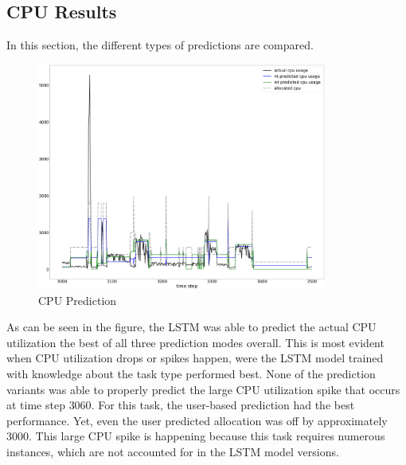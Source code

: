 \documentclass{article}
\begin{document}
  \subsection{CPU Results}
  \label{sec:cpu-results}


    In this section, the different types of predictions are compared.
    
    \begin{figure}[h!]
      \centering
      \includegraphics[width=0.85\textwidth]{figures/training_cpu_prediction.png}
      \caption{CPU Prediction}
      \label{fig:cpu-prediction}
    \end{figure}
    As can be seen in the figure, the LSTM  was able to predict the actual CPU utilization the best of all three prediction modes overall.
    This is most evident when CPU utilization drops or spikes happen, were the LSTM model trained with knowledge about the task type performed best.
    None of the prediction variants was able to properly predict the large CPU utilization spike that occurs at time step $3060$. For this task, the user-based prediction had the best performance. Yet, even the user predicted allocation was off by approximately 3000. This large CPU spike is happening because this task requires numerous instances, which are not accounted for in the LSTM model versions.
\end{document}
